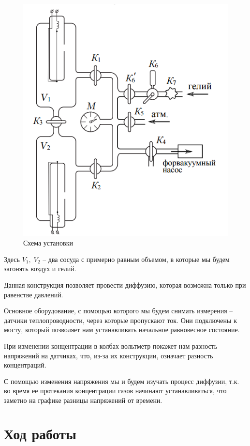 \documentclass[a4paper,12pt]{article}
\theoremstyle{definition}
\begin{document}
		\begin{figure}
			\includegraphics[scale=0.8]{facility}				
			\caption{Схема установки}
			\label{facility}
		\end{figure}
		Здесь $V_1,\; V_2$ -- два сосуда с примерно равным объемом, в которые мы будем загонять воздух и гелий.
		
		Данная конструкция позволяет провести диффузию, которая возможна только при равенстве давлений.
		
		Основное оборудование, с помощью которого мы будем снимать измерения -- датчики теплопроводности, через которые пропускают ток. Они подключены к мосту, который позволяет нам устанавливать начальное равновесное состояние.
		
		При изменении концентрации в колбах вольтметр покажет нам разность напряжений на датчиках, что, из-за их конструкции, означает разность концентраций. 
		
		С помощью изменения напряжения мы и будем изучать процесс диффузии, т.к. во время ее протекания концентрации газов начинают устанавливаться, что заметно на графике разницы напряжений от времени.
		
	\section{Ход работы}
	
\end{document}
